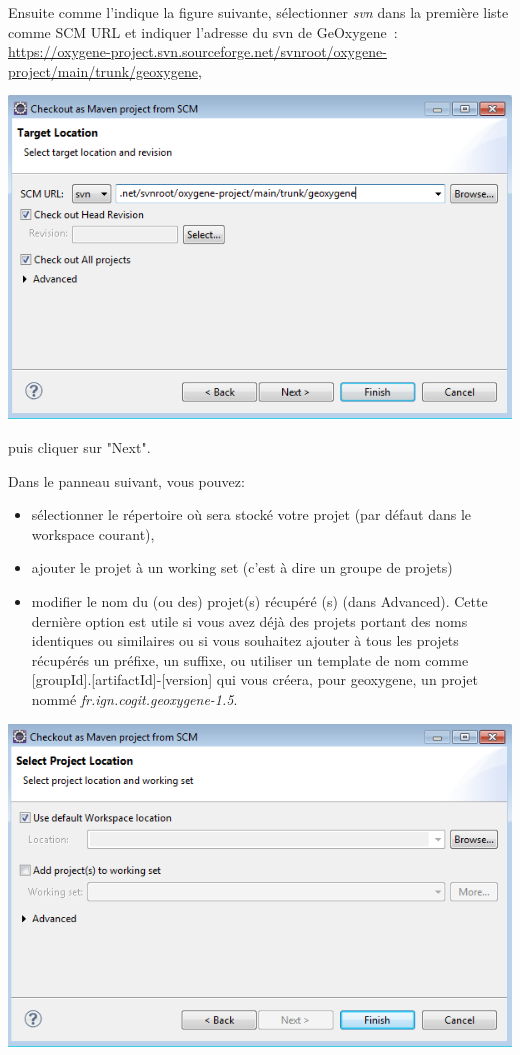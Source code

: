\newpage

\noindent
Ensuite comme l'indique la figure suivante, sélectionner \emph{svn} dans la première liste comme SCM URL et indiquer l'adresse du svn de GeOxygene~:\\
\href{https://oxygene-project.svn.sourceforge.net/svnroot/oxygene-project/main/trunk/geoxygene}{https://oxygene-project.svn.sourceforge.net/svnroot/oxygene-project/main/trunk/geoxygene}, 

\begin{center}
\includegraphics[width=0.5\linewidth]{../../resources/images/guide_installation/geoxygeneEtape3.png}
\end{center}

\bigskip

\noindent
puis cliquer sur "Next".

\bigskip

\noindent
Dans le panneau suivant, vous pouvez:
\begin{itemize}[label=--, leftmargin=* ,parsep=0cm,itemsep=0cm,topsep=0cm]
\item sélectionner le répertoire où sera stocké votre projet (par défaut dans le workspace courant), 
\item ajouter le projet à un working set (c'est à dire un groupe de projets)
\item modifier le nom du (ou des) projet(s) récupéré (s) (dans Advanced). Cette dernière option est utile si vous avez déjà des projets portant des noms identiques ou similaires ou si vous souhaitez ajouter à tous les projets récupérés un préfixe, un suffixe, ou utiliser un template de nom comme [groupId].[artifactId]-[version] qui vous créera, pour geoxygene, un projet nommé \emph{fr.ign.cogit.geoxygene-1.5}.
\end{itemize}

\begin{center}
\includegraphics[width=0.5\linewidth]{../../resources/images/guide_installation/geoxygeneEtape4.png}
\end{center}


